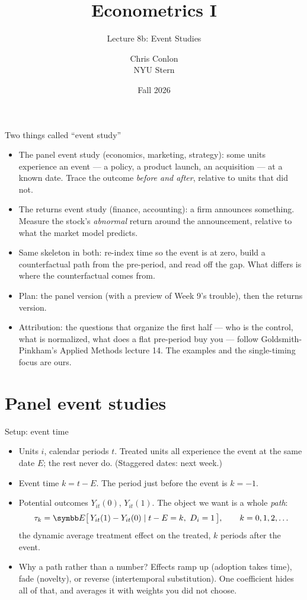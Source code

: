 \documentclass[aspectratio=169,11pt]{beamer}
\title[L9b - Event Studies]{ Econometrics I}
\subtitle{Lecture 8b: Event Studies}
\author{Chris Conlon \\NYU Stern}
\date{Fall 2026}
\begin{document}
\maketitle

\begin{frame}{Two things called ``event study''}
\begin{itemize}
	\item \alert{The panel event study} (economics, marketing, strategy): some units experience an
	event --- a policy, a product launch, an acquisition --- at a known date. Trace the outcome
	\emph{before and after}, relative to units that did not.
	\medskip
	\item \alert{The returns event study} (finance, accounting): a firm announces something. Measure
	the stock's \emph{abnormal} return around the announcement, relative to what the market model
	predicts.
	\medskip
	\item Same skeleton in both: re-index time so the event is at zero, build a counterfactual path
	from the pre-period, and read off the gap. What differs is where the counterfactual comes from.
	\medskip
	\item Plan: the panel version (with a preview of Week 9's trouble), then the returns version.
	\medskip
	\item {\small Attribution: the questions that organize the first half --- who is the control,
	what is normalized, what does a flat pre-period buy you --- follow Goldsmith-Pinkham's
	Applied Methods lecture 14. The examples and the single-timing focus are ours.}
\end{itemize}
\end{frame}


\section{Panel event studies}

\begin{frame}{Setup: event time}
\begin{itemize}
	\item Units $i$, calendar periods $t$. Treated units all experience the event at the same
	date $E$; the rest never do. (Staggered dates: next week.)
	\medskip
	\item \alert{Event time} $k = t - E$. The period just before the event is $k = -1$.
	\medskip
	\item Potential outcomes $Y_{it}(0)$, $Y_{it}(1)$. The object we want is a whole \emph{path}:
	\begin{align*}
		\tau_k = \E\big[\,Y_{it}(1) - Y_{it}(0) \mid t - E = k,\ D_i = 1\,\big], \qquad k = 0, 1, 2, \dots
	\end{align*}
	the dynamic average treatment effect on the treated, $k$ periods after the event.
	\medskip
	\item Why a path rather than a number? Effects ramp up (adoption takes time), fade (novelty),
	or reverse (intertemporal substitution). One coefficient hides all of that, and averages it
	with weights you did not choose.
\end{itemize}
\end{frame}
\end{document}
